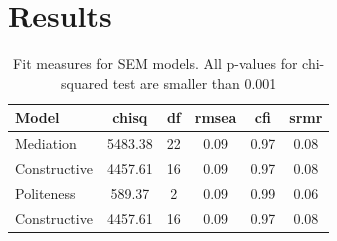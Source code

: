 \documentclass{article}
\begin{document}
\section{Results}

\begin{table}[H]
\centering
\caption{\label{tab:sem-fit-measures}Fit measures for SEM models. All p-values for chi-squared test are smaller than 0.001}
\centering
\begin{tabular}[t]{lccccc}
\toprule
Model & chisq & df & rmsea & cfi & srmr\\
\midrule
Mediation & 5483.38 & 22 & 0.09 & 0.97 & 0.08\\
\cmidrule{1-6}
Constructive & 4457.61 & 16 & 0.09 & 0.97 & 0.08\\
\cmidrule{1-6}
Politeness & 589.37 & 2 & 0.09 & 0.99 & 0.06\\
\cmidrule{1-6}
Constructive & 4457.61 & 16 & 0.09 & 0.97 & 0.08\\
\bottomrule
\end{tabular}
\end{table}
\end{document}
